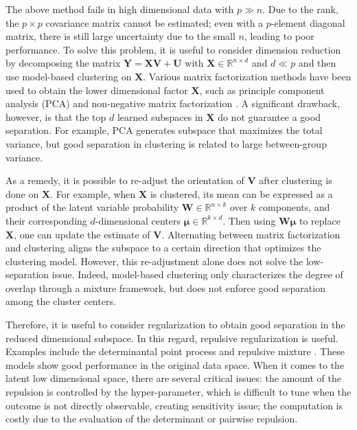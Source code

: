 \documentclass[12pt]{article}
\newcommand{\bb}[1]{\mathbb{#1}}
\newcommand{\bl}{\boldsymbol}
\begin{document}
The above method fails in high dimensional data with $p\gg n$. Due to the rank, the $p\times p$ covariance matrix cannot be estimated; even with a $p$-element diagonal matrix, there is still large uncertainty due to the small $n$, leading to poor performance. To solve this problem, it is useful to consider dimension reduction by decomposing the matrix $\bl Y= \bl X \bl V + \bl U$ with $\bl X\in \bb R^{n\times d}$ and $d\ll p$ and then use model-based clustering on $\bl X$. Various matrix factorization methods have been used to obtain the lower dimensional factor $\bl X$, such as principle component analysis (PCA) \citep{liu2003pca} and non-negative matrix factorization \citep{tamayo2007metagene}. A significant drawback, however, is that the top $d$ learned subspaces in $\bl X$ do not guarantee a good separation. For example, PCA generates subspace that maximizes the total variance, but good separation in clustering is related to large between-group variance.

As a remedy, it is possible to re-adjust the orientation of $\bl V$ after clustering is done on $\bl X$. For example, when $\bl X$ is clustered, its mean can be expressed as a product of the latent variable probability $\bl W\in \bb R^{n\times k}$ over $k$ components, and their corresponding $d$-dimensional centers $\bl \mu \in \bb R^{k \times d}$. Then using $\bl{W\mu}$ to replace $\bl X$, one can update the estimate of $\bl V$. Alternating between matrix factorization and clustering aligns the subspace to a certain direction that optimizes the clustering model. However, this re-adjustment alone does not solve the low-separation issue. Indeed, model-based clustering only characterizes the degree of overlap through a mixture framework, but does not enforce good separation among the cluster centers.

Therefore, it is useful to consider regularization to obtain good separation in the reduced dimensional subspace. In this regard, repulsive regularization is useful. Examples include the determinantal point process \citep{Kulesza:2012:DPP:2481023} and repulsive mixture \citep{petralia2012repulsive}. These models show good performance in the original data space. When it comes to the latent low dimensional space, there are several critical issues: the amount of the repulsion is controlled by the hyper-parameter, which is difficult to tune when the outcome is not directly observable, creating sensitivity issue; the computation is costly due to the evaluation of the determinant or pairwise repulsion.
\end{document}
